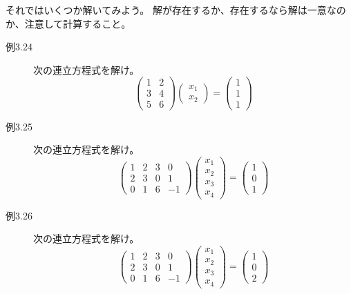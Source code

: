 \documentclass[10pt]{jsreport}
\theoremstyle{definition}%
\numberwithin{equation}{section}%
\begin{document}
それではいくつか解いてみよう。
解が存在するか、存在するなら解は一意なのか、注意して計算すること。
\begin{description}
  \item[例3.24] 次の連立方程式を解け。
  \begin{equation}
    \begin{pmatrix}
      1 & 2\\
      3 & 4\\
      5 & 6
    \end{pmatrix}
    \begin{pmatrix}
    x_{1}\\
    x_{2}  
    \end{pmatrix}=\begin{pmatrix}
      1\\
      1\\
      1
    \end{pmatrix}
  \end{equation}
  \item[例3.25] 次の連立方程式を解け。
  \begin{equation}
    \begin{pmatrix}
      1 & 2 & 3 & 0\\
      2 & 3 & 0 & 1\\
      0 & 1 & 6 & -1
    \end{pmatrix}
    \begin{pmatrix}
    x_{1}\\
    x_{2}\\
    x_{3}\\
    x_{4}
    \end{pmatrix}=\begin{pmatrix}
      1\\
      0\\
      1
    \end{pmatrix}
  \end{equation}
  \item[例3.26] 次の連立方程式を解け。
  \begin{equation}
    \begin{pmatrix}
      1 & 2 & 3 & 0\\
      2 & 3 & 0 & 1\\
      0 & 1 & 6 & -1
    \end{pmatrix}
    \begin{pmatrix}
    x_{1}\\
    x_{2}\\
    x_{3}\\
    x_{4}
    \end{pmatrix}=\begin{pmatrix}
      1\\
      0\\
      2
    \end{pmatrix}
  \end{equation}
\end{description}
\end{document}
